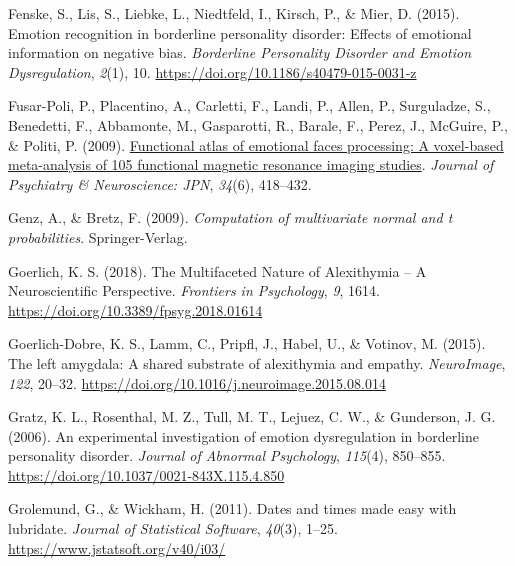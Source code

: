 \documentclass[
  man,floatsintext]{apa7}
\newlength{\cslhangindent}
\newlength{\cslentryspacingunit} %
\newenvironment{CSLReferences}[2] %
 {%
  \setlength{\parindent}{0pt}
  \ifodd #1
  \let\oldpar\par
  \def\par{\hangindent=\cslhangindent\oldpar}
  \fi
  \setlength{\parskip}{#2\cslentryspacingunit}
 }%
 {}
\begin{document}
\begin{CSLReferences}{1}{0}
\leavevmode{}%
Fenske, S., Lis, S., Liebke, L., Niedtfeld, I., Kirsch, P., \& Mier, D. (2015). Emotion recognition in borderline personality disorder: Effects of emotional information on negative bias. \emph{Borderline Personality Disorder and Emotion Dysregulation}, \emph{2}(1), 10. \url{https://doi.org/10.1186/s40479-015-0031-z}

\leavevmode{}%
Fusar-Poli, P., Placentino, A., Carletti, F., Landi, P., Allen, P., Surguladze, S., Benedetti, F., Abbamonte, M., Gasparotti, R., Barale, F., Perez, J., McGuire, P., \& Politi, P. (2009). \href{https://www.ncbi.nlm.nih.gov/pmc/articles/PMC2783433}{Functional atlas of emotional faces processing: A voxel-based meta-analysis of 105 functional magnetic resonance imaging studies}. \emph{Journal of Psychiatry \& Neuroscience: JPN}, \emph{34}(6), 418--432.

\leavevmode{}%
Genz, A., \& Bretz, F. (2009). \emph{Computation of multivariate normal and t probabilities}. Springer-Verlag.

\leavevmode{}%
Goerlich, K. S. (2018). The {Multifaceted Nature} of {Alexithymia} -- {A Neuroscientific Perspective}. \emph{Frontiers in Psychology}, \emph{9}, 1614. \url{https://doi.org/10.3389/fpsyg.2018.01614}

\leavevmode{}%
Goerlich-Dobre, K. S., Lamm, C., Pripfl, J., Habel, U., \& Votinov, M. (2015). The left amygdala: {A} shared substrate of alexithymia and empathy. \emph{NeuroImage}, \emph{122}, 20--32. \url{https://doi.org/10.1016/j.neuroimage.2015.08.014}

\leavevmode{}%
Gratz, K. L., Rosenthal, M. Z., Tull, M. T., Lejuez, C. W., \& Gunderson, J. G. (2006). An experimental investigation of emotion dysregulation in borderline personality disorder. \emph{Journal of Abnormal Psychology}, \emph{115}(4), 850--855. \url{https://doi.org/10.1037/0021-843X.115.4.850}

\leavevmode{}%
Grolemund, G., \& Wickham, H. (2011). Dates and times made easy with {lubridate}. \emph{Journal of Statistical Software}, \emph{40}(3), 1--25. \url{https://www.jstatsoft.org/v40/i03/}


\end{CSLReferences}
\end{document}
